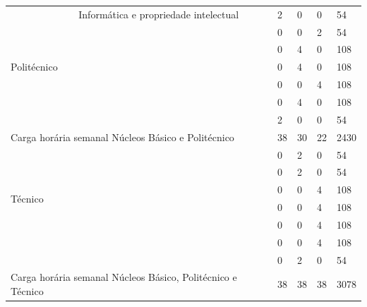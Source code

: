 \documentclass[11pt,fleqn]{book} %
\begin{document}
\begin{table}[H]
{\begin{tabular}{|l|l|l|l|l|l|}
			\multirow{7}{*}{Politécnico}   & Informática e propriedade intelectual            & 2          & 0         & 0         & 54        \\ \cline{2-6} 
			& \nameref{disc:espanhol_libras}          & 0          & 0         & 2         & 54        \\ \cline{2-6} 
			& \nameref{disc:fermentacao}                                      & 0          & 4         & 0         & 108       \\ \cline{2-6} 
			& \nameref{disc:bioquimica}                                       & 0          & 4         & 0         & 108       \\ \cline{2-6} 
			& \nameref{disc:microbiologia}                                    & 0          & 0         & 4         & 108       \\ \cline{2-6} 
			& \nameref{disc:biomol}                      & 0          & 4         & 0         & 108       \\ \cline{2-6} 
			& \nameref{disc:laboratorio}       & 2          & 0         & 0         & 54        \\ \hline
			\multicolumn{2}{|l|}{Carga horária semanal Núcleos Básico  e Politécnico}         & 38         & 30        & 22        & 2430      \\ \hline
			\multirow{6}{*}{Técnico}       & \nameref{disc:biotecAnimal}                             & 0          & 2         & 0         & 54       \\ \cline{2-6} 
			& \nameref{disc:biotecVegetal}                            & 0          & 2         & 0         & 54       \\ \cline{2-6} 
			& \nameref{disc:biotecAlimentos}                       & 0          & 0         & 4         & 108       \\ \cline{2-6} 
			& \nameref{disc:biotecFarmacos}        & 0          & 0         & 4         & 108       \\ \cline{2-6} 
			& \nameref{disc:biotecSaude}                    & 0          & 0         & 4         & 108       \\ \cline{2-6} 
			& \nameref{disc:producao}                          & 0          & 0         & 4         & 108       \\ \hline
			& \nameref{disc:analitica}                          & 0          & 2         & 0         & 54       \\ \hline
			\multicolumn{2}{|l|}{Carga horária semanal Núcleos Básico, Politécnico e Técnico} & 38         & 38        & 38        & 3078      \\ \hline

\end{tabular}}
\end{table}
\end{document}
